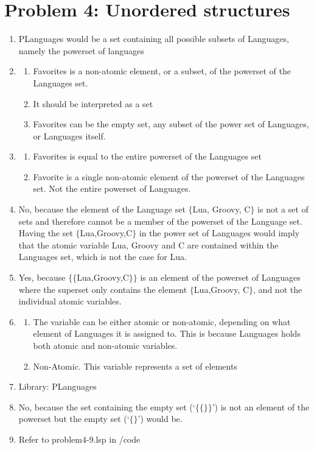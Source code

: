 \documentclass[12pt]{article}
\begin{document}
\section*{Problem 4: Unordered structures}
\begin{enumerate}
	\item PLanguages would be a set containing all possible subsets of Languages, namely the powerset of languages
	\item 
	\begin{enumerate}
		\item Favorites is a non-atomic element, or a subset, of the powerset of the Languages set.
		\item It should be interpreted as a set
		\item Favorites can be the empty set, any subset of the power set of Languages, or Languages itself.
	\end{enumerate}
	\item
	\begin{enumerate}
		\item Favorites is equal to the entire powerset of the Languages set
		\item Favorite is a single non-atomic element of the powerset of the Languages set. Not the entire powerset of Languages.
	\end{enumerate}
	
	\item No, because the element of the Language set $\{$Lua, Groovy, C$\}$ is not a set of sets and therefore cannot be a member of the powerset of the Language set.
	Having the set $\{$Lua,Groovy,C$\}$ in the power set of Languages would imply that the atomic variable Lua, Groovy and C are contained within the Languages set, which is not the case for Lua.
	
	\item Yes, because $\{ \{$Lua,Groovy,C$\} \}$ is an element of the powerset of Languages where the superset only contains the element $\{$Lua,Groovy, C$\}$, and not the individual atomic variables.
	\item
	\begin{enumerate}
		\item The variable can be either atomic or non-atomic, depending on what element of Languages it is assigned to. This is because Languages holds both atomic and non-atomic variables.
		\item Non-Atomic. This variable represents a set of elements
	\end{enumerate}	
	\item Library: PLanguages
	\item No, because the set containing the empty set (‘$\{ \{ \} \}$’) is not an element of the powerset but the empty set (‘$\{ \}$’) would be.
	\item Refer to problem4-9.lsp in /code
\end{enumerate}
\end{document}
